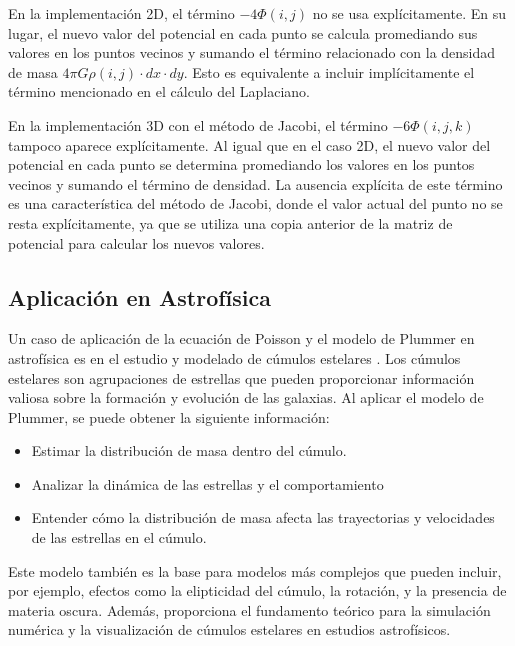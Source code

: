 \documentclass[reprint,amsmath,amssymb,aps]{revtex4-2}
\begin{document}
En la implementación 2D, el término $-4\Phi(i, j)$ no se usa explícitamente. En su lugar, el nuevo valor del potencial en cada punto se calcula promediando sus valores en los puntos vecinos y sumando el término relacionado con la densidad de masa $4\pi G \rho(i, j) \cdot dx \cdot dy$. Esto es equivalente a incluir implícitamente el término mencionado en el cálculo del Laplaciano.

En la implementación 3D con el método de Jacobi, el término $-6\Phi(i, j, k)$ tampoco aparece explícitamente. Al igual que en el caso 2D, el nuevo valor del potencial en cada punto se determina promediando los valores en los puntos vecinos y sumando el término de densidad. La ausencia explícita de este término es una característica del método de Jacobi, donde el valor actual del punto no se resta explícitamente, ya que se utiliza una copia anterior de la matriz de potencial para calcular los nuevos valores.

\subsection{Aplicación en Astrofísica}
Un caso de aplicación de la ecuación de Poisson y el modelo de Plummer en astrofísica es en el estudio y modelado de cúmulos estelares \cite{astro,astro1,astro2}. Los cúmulos estelares son agrupaciones de estrellas que pueden proporcionar información valiosa sobre la formación y evolución de las galaxias. Al aplicar el modelo de Plummer, se puede obtener la siguiente información:
\begin{itemize}
    \item Estimar la distribución de masa dentro del cúmulo.
     \item Analizar la dinámica de las estrellas y el comportamiento
    \item Entender cómo la distribución de masa afecta las trayectorias y velocidades de las estrellas en el cúmulo.
\end{itemize}

Este modelo también es la base para modelos más complejos que pueden incluir, por ejemplo, efectos como la elipticidad del cúmulo, la rotación, y la presencia de materia oscura. Además, proporciona el fundamento teórico para la simulación numérica y la visualización de cúmulos estelares en estudios astrofísicos.
\end{document}
